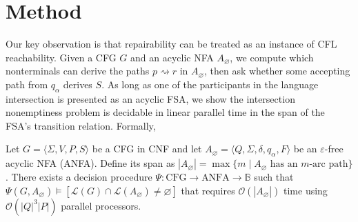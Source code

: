 \documentclass[popl.tex]{subfiles}
\begin{document}
\clearpage\section{Method}\label{sec:method}

Our key observation is that repairability can be treated as an instance of CFL reachability. Given a CFG \(G\) and an acyclic NFA \(A_\varnothing\), we compute which nonterminals can derive the paths \(p\rightsquigarrow r\) in \(A_\varnothing\), then ask whether some accepting path from \(q_\alpha\) derives $S$. As long as one of the participants in the language intersection is presented as an acyclic FSA, we show the intersection nonemptiness problem is decidable in linear parallel time in the span of the FSA's transition relation. Formally,

\begin{theorem}\label{thm:parallel_decision_complexity}
  Let \(G=\langle \Sigma, V,P,S\rangle\) be a CFG in CNF and let \(A_\varnothing=\langle Q,\Sigma,\delta,q_\alpha,F\rangle\) be an \(\varepsilon\)-free acyclic NFA (ANFA). Define its span as \( |A_\varnothing|=\max\{m\mid A_\varnothing\text{ has an }m\text{-arc path}\}\). There exists a decision procedure \(\Psi: \text{CFG} \rightarrow \text{ANFA} \rightarrow \mathbb{B}\) such that
  \(\Psi(G,A_\varnothing)\vDash [\mathcal L(G)\cap\mathcal L(A_\varnothing)\neq\varnothing]\) that requires \(\mathcal{O}(|A_\varnothing|)\) time using $\mathcal{O}(|Q|^3|P|)$ parallel processors.
\end{theorem}
\end{document}
